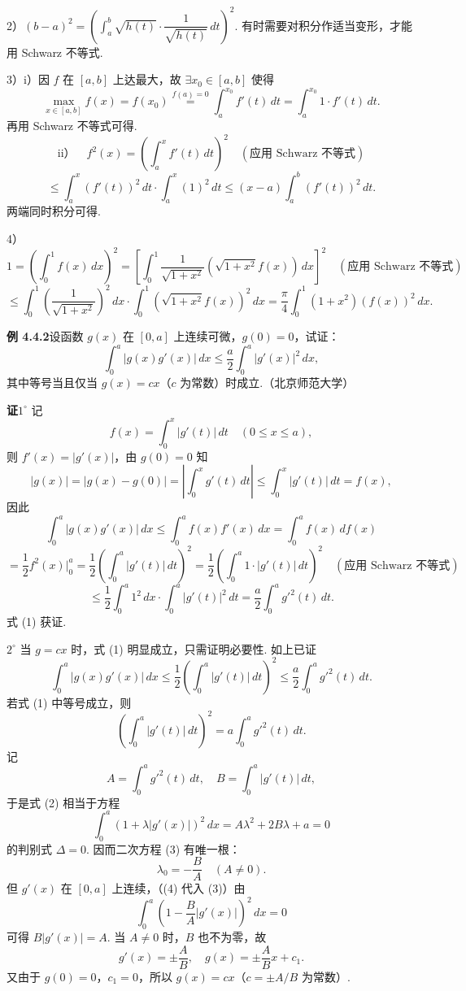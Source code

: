 \documentclass[UTF8, 12pt, fontset=fandol, oneside]{ctexart}
\begin{document}
2）$(b-a)^2=\left(\displaystyle\int_a^b \sqrt{h(t)}\cdot\dfrac1{\sqrt{h(t)}}\,dt\right)^2$. 有时需要对积分作适当变形，才能用 Schwarz 不等式.

3）i）因 $f$ 在 $[a,b]$ 上达最大，故 $\exists x_0\in[a,b]$ 使得
\[
\max_{x\in[a,b]}f(x)=f(x_0)\stackrel{f(a)=0}{=}\int_a^{x_0}f'(t)\,dt=\int_a^{x_0}1\cdot f'(t)\,dt.
\]
再用 Schwarz 不等式可得.
\[
\text{ii）}\quad f^2(x)=\left(\int_a^x f'(t)\,dt\right)^2\quad(\text{应用 Schwarz 不等式})
\]
\[
\le \int_a^x(f'(t))^2\,dt\cdot\int_a^x(1)^2\,dt
\le (x-a)\int_a^b(f'(t))^2\,dt.
\]
两端同时积分可得.

4）
\[
1=\left(\int_0^1 f(x)\,dx\right)^2
=\left[\int_0^1\frac1{\sqrt{1+x^2}}(\sqrt{1+x^2}f(x))\,dx\right]^2\quad(\text{应用 Schwarz 不等式})
\]
\[
\le \int_0^1\left(\frac1{\sqrt{1+x^2}}\right)^2\,dx\cdot
\int_0^1(\sqrt{1+x^2}f(x))^2\,dx
=\frac\pi4\int_0^1(1+x^2)(f(x))^2\,dx.
\]

\noindent\textbf{例 4.4.2}\quad 设函数 $g(x)$ 在 $[0,a]$ 上连续可微，$g(0)=0$，试证：
\[
\int_0^a |g(x)g'(x)|\,dx\le\frac a2\int_0^a |g'(x)|^2\,dx, \tag{1}
\]
其中等号当且仅当 $g(x)=cx$（$c$ 为常数）时成立.（北京师范大学）

\noindent\textbf{证}\quad $1^\circ$ 记
\[
f(x)=\int_0^x |g'(t)|\,dt\quad(0\le x\le a),
\]
则 $f'(x)=|g'(x)|$，由 $g(0)=0$ 知
\[
|g(x)|=|g(x)-g(0)|=\left|\int_0^x g'(t)\,dt\right|
\le \int_0^x |g'(t)|\,dt=f(x),
\]
因此
\[
\int_0^a |g(x)g'(x)|\,dx
\le \int_0^a f(x)f'(x)\,dx
=\int_0^a f(x)\,df(x)
\]
\[
=\frac12 f^2(x)\bigg|_0^a
=\frac12\left(\int_0^a |g'(t)|\,dt\right)^2
=\frac12\left(\int_0^a 1\cdot |g'(t)|\,dt\right)^2
\quad(\text{应用 Schwarz 不等式})
\]
\[
\le \frac12\int_0^a 1^2\,dx\cdot\int_0^a |g'(t)|^2\,dt
=\frac a2\int_0^a g'^2(t)\,dt.
\]
式 (1) 获证.

$2^\circ$ 当 $g=cx$ 时，式 (1) 明显成立，只需证明必要性. 如上已证
\[
\int_0^a |g(x)g'(x)|\,dx
\le \frac12\left(\int_0^a |g'(t)|\,dt\right)^2
\le \frac a2\int_0^a g'^2(t)\,dt.
\]
若式 (1) 中等号成立，则
\[
\left(\int_0^a |g'(t)|\,dt\right)^2=a\int_0^a g'^2(t)\,dt. \tag{2}
\]
记
\[
A=\int_0^a g'^2(t)\,dt,\quad B=\int_0^a |g'(t)|\,dt,
\]
于是式 (2) 相当于方程
\[
\int_0^a (1+\lambda |g'(x)|)^2\,dx=A\lambda^2+2B\lambda+a=0 \tag{3}
\]
的判别式 $\Delta=0$. 因而二次方程 (3) 有唯一根：
\[
\lambda_0=-\frac BA\quad(A\ne0). \tag{4}
\]
但 $g'(x)$ 在 $[0,a]$ 上连续，（(4) 代入 (3)）由
\[
\int_0^a\left(1-\frac BA|g'(x)|\right)^2\,dx=0
\]
可得 $B|g'(x)|=A$.
当 $A\ne0$ 时，$B$ 也不为零，故
\[
g'(x)=\pm\frac AB,\quad g(x)=\pm\frac ABx+c_1.
\]
又由于 $g(0)=0$，$c_1=0$，所以 $g(x)=cx$（$c=\pm A/B$ 为常数）.
\end{document}

